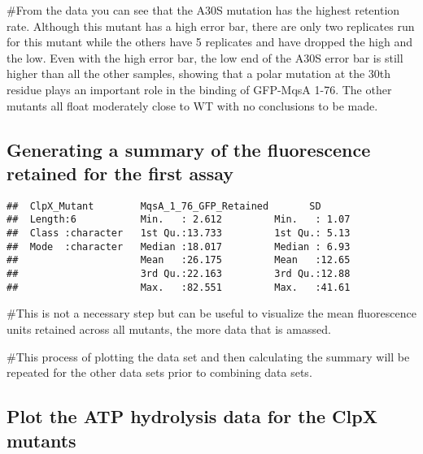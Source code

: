 \documentclass[]{article}
\newenvironment{Shaded}{\begin{snugshade}}{\end{snugshade}}
\newcommand{\DecValTok}[1]{\textcolor[rgb]{0.00,0.00,0.81}{#1}}
\newcommand{\KeywordTok}[1]{\textcolor[rgb]{0.13,0.29,0.53}{\textbf{#1}}}
\newcommand{\NormalTok}[1]{#1}
\newcommand{\OperatorTok}[1]{\textcolor[rgb]{0.81,0.36,0.00}{\textbf{#1}}}
\newcommand{\StringTok}[1]{\textcolor[rgb]{0.31,0.60,0.02}{#1}}
\begin{document}
\#From the data you can see that the A30S mutation has the highest
retention rate. Although this mutant has a high error bar, there are
only two replicates run for this mutant while the others have 5
replicates and have dropped the high and the low. Even with the high
error bar, the low end of the A30S error bar is still higher than all
the other samples, showing that a polar mutation at the 30th residue
plays an important role in the binding of GFP-MqsA 1-76. The other
mutants all float moderately close to WT with no conclusions to be made.

\hypertarget{generating-a-summary-of-the-fluorescence-retained-for-the-first-assay}{%
\subsection{Generating a summary of the fluorescence retained for the
first
assay}\label{generating-a-summary-of-the-fluorescence-retained-for-the-first-assay}}

\begin{Shaded}
\end{Shaded}

\begin{verbatim}
##  ClpX_Mutant        MqsA_1_76_GFP_Retained       SD       
##  Length:6           Min.   : 2.612         Min.   : 1.07  
##  Class :character   1st Qu.:13.733         1st Qu.: 5.13  
##  Mode  :character   Median :18.017         Median : 6.93  
##                     Mean   :26.175         Mean   :12.65  
##                     3rd Qu.:22.163         3rd Qu.:12.88  
##                     Max.   :82.551         Max.   :41.61
\end{verbatim}

\#This is not a necessary step but can be useful to visualize the mean
fluorescence units retained across all mutants, the more data that is
amassed.

\#This process of plotting the data set and then calculating the summary
will be repeated for the other data sets prior to combining data sets.

\hypertarget{plot-the-atp-hydrolysis-data-for-the-clpx-mutants}{%
\subsection{Plot the ATP hydrolysis data for the ClpX
mutants}\label{plot-the-atp-hydrolysis-data-for-the-clpx-mutants}}
\end{document}
